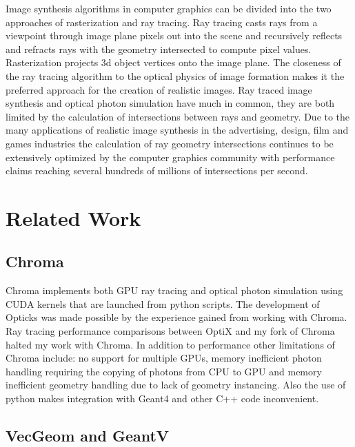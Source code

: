 \documentclass[a4paper]{jpconf}
\begin{document}
Image synthesis algorithms in computer graphics can be divided into 
the two approaches of rasterization and ray tracing. 
Ray tracing casts rays from a viewpoint through image plane pixels out 
into the scene and recursively reflects and refracts rays with the geometry intersected 
to compute pixel values. Rasterization projects 3d object vertices onto the image plane.
The closeness of the ray tracing algorithm to the optical physics of image formation
makes it the preferred approach for the creation of realistic images. 
Ray traced image synthesis and optical photon simulation have much in common, 
they are both limited by the calculation of intersections between rays and geometry.  
Due to the many applications of realistic image synthesis in the 
advertising, design, film and games industries the calculation of ray geometry intersections 
continues to be extensively optimized by the computer graphics community with performance claims 
reaching several hundreds of millions of intersections per second\cite{understanding}.


\section{Related Work}

\subsection{Chroma}

Chroma\cite{chromaURL}\cite{chromaB} implements both GPU ray tracing and optical photon simulation 
using CUDA kernels that are launched from python scripts. 
The development of Opticks was made possible by the experience gained from working with Chroma.
Ray tracing performance comparisons between OptiX and my 
fork of Chroma\cite{chromaFork} halted my work with Chroma.
In addition to performance other limitations of Chroma include:
no support for multiple GPUs, memory inefficient photon handling requiring the copying of photons from CPU to GPU
and memory inefficient geometry handling due to lack of geometry instancing.
Also the use of python makes integration with Geant4 and other C++ code inconvenient. 

\subsection{VecGeom and GeantV}

\end{document}

